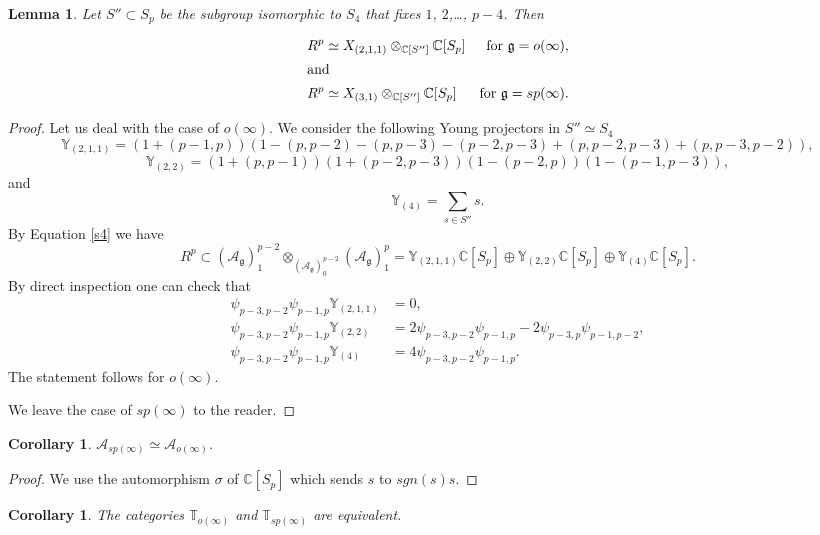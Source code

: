 \documentclass{amsart}
\newcommand{\so}{o}
\newcommand{\T}{\mathbb T}
\renewcommand{\sp}{sp}
\renewcommand{\gg}{\mathfrak{g}}
\newtheorem{lemma}[thm]{Lemma}
\newtheorem{cor}[thm]{Corollary}
\theoremstyle{definition}
\numberwithin{equation}{section}
\begin{document}
\begin{lemma} Let $S'' \subset S_p$ be the subgroup isomorphic to $S_4$ that fixes $1$, $2$,\dots, $p-4$. Then

\begin{align*}
R^p & \simeq  X_{(2,1,1)}\otimes_{\mathbb C[S'']}\mathbb C[S_p] & \textrm{for } \gg=\so(\infty), \\
\intertext{and}
R^p & \simeq  X_{(3,1)}\otimes_{\mathbb C[S'']}\mathbb C[S_p] &\textrm{for } \gg=\sp(\infty).
\end{align*}
\end{lemma}
\begin{proof} Let us deal with the case of  $\so(\infty)$. 
We consider the following Young projectors  in $S'' \simeq S_4$
$$\mathbb Y_{(2,1,1)}=(1+(p-1,p))(1-(p,p-2)-(p,p-3)-(p-2,p-3)+(p,p-2,p-3)+(p,p-3,p-2)),$$
$$\mathbb Y_{(2,2)}=(1+(p,p-1))(1+(p-2,p-3))(1-(p-2,p))(1-(p-1,p-3)),$$
and $$\mathbb Y_{(4)}=\sum_{s\in S''}s.$$
By Equation \eqref{s4} we have
$$R^p\subset (\mathcal A_\gg)_1^{p-2}\otimes_{(\mathcal
  A_\gg)_0^{p-2}} (\mathcal  A_\gg)_1^{p}=\mathbb Y_{(2,1,1)}\mathbb C[S_p]\oplus 
\mathbb Y_{(2,2)}\mathbb C[S_p]\oplus \mathbb Y_{(4)}\mathbb C[S_p].$$
By direct inspection one can check that
\begin{align*}
\psi_{p-3,p-2}\psi_{p-1,p}\mathbb Y_{(2,1,1)}&=0,\\
\psi_{p-3,p-2}\psi_{p-1,p}\mathbb Y_{(2,2)}&=2\psi_{p-3,p-2}\psi_{p-1,p}-2\psi_{p-3,p}\psi_{p-1,p-2},\\
\psi_{p-3,p-2}\psi_{p-1,p}\mathbb Y_{(4)}&=4\psi_{p-3,p-2}\psi_{p-1,p}.
\end{align*}
The statement follows for $\so(\infty)$.

We leave the case of $\sp(\infty)$ to the reader. 
\end{proof}


\begin{cor} $\mathcal A_{\sp(\infty)}\simeq \mathcal A_{\so(\infty)}$.
\end{cor}
\begin{proof} We use the automorphism $\sigma$ of $\mathbb C[S_p]$ which sends $s$
  to $sgn(s)s$.
\end{proof}

\begin{cor}\label{isomosp}
The categories $\T_{o(\infty)}$ and $\T_{sp(\infty)}$ are equivalent.
\end{cor}
\end{document}
